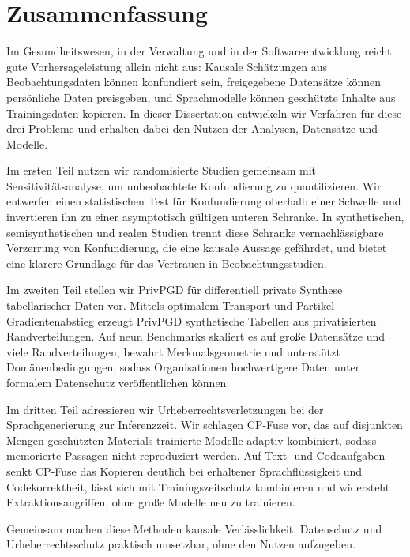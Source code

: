 \begingroup
{}
\let\clearpage\relax
\let\cleardoublepage\relax
\chapter*{Zusammenfassung}

Im Gesundheitswesen, in der Verwaltung und in der Softwareentwicklung reicht gute Vorhersageleistung allein nicht aus: Kausale Schätzungen aus Beobachtungsdaten können konfundiert sein, freigegebene Datensätze können persönliche Daten preisgeben, und Sprachmodelle können geschützte Inhalte aus Trainingsdaten kopieren. In dieser Dissertation entwickeln wir Verfahren für diese drei Probleme und erhalten dabei den Nutzen der Analysen, Datensätze und Modelle.

Im ersten Teil nutzen wir randomisierte Studien gemeinsam mit Sen\-si\-ti\-vi\-täts\-ana\-ly\-se, um unbeobachtete Konfundierung zu quantifizieren. Wir entwerfen einen statistischen Test für Konfundierung oberhalb einer Schwelle und invertieren ihn zu einer asymptotisch gül\-ti\-gen unteren Schranke. In synthetischen, semisynthetischen und realen Studien trennt diese Schranke ver\-nach\-läs\-sig\-ba\-re Verzerrung von Konfundierung, die eine kausale Aussage gefährdet, und bietet eine klarere Grundlage für das Vertrauen in Beobachtungsstudien.

Im zweiten Teil stellen wir PrivPGD für differentiell private Synthese tabellarischer Daten vor. Mittels optimalem Transport und Partikel-Gradientenabstieg erzeugt PrivPGD synthetische Tabellen aus privatisierten Randverteilungen. Auf neun Benchmarks skaliert es auf große Datensätze und viele Randverteilungen, bewahrt Merkmalsgeometrie und unterstützt Domänenbedingungen, sodass Organisationen hochwertigere Daten unter formalem Datenschutz veröffentlichen können.

Im dritten Teil adressieren wir Urheberrechtsverletzungen bei der Sprachgenerierung zur Inferenzzeit. Wir schlagen CP-Fuse vor, das auf disjunkten Mengen geschützten Materials trainierte Modelle adaptiv kombiniert, sodass memorierte Passagen nicht reproduziert werden. Auf Text- und Codeaufgaben senkt CP-Fuse das Kopieren deutlich bei erhaltener Sprach\-flüs\-sig\-keit und Codekorrektheit, lässt sich mit Trainingszeitschutz kombinieren und widersteht Extraktionsangriffen, ohne große Modelle neu zu trainieren.

Gemeinsam machen diese Methoden kausale Verlässlichkeit, Datenschutz und Urheberrechtsschutz praktisch umsetzbar, ohne den Nutzen aufzugeben.

\endgroup
